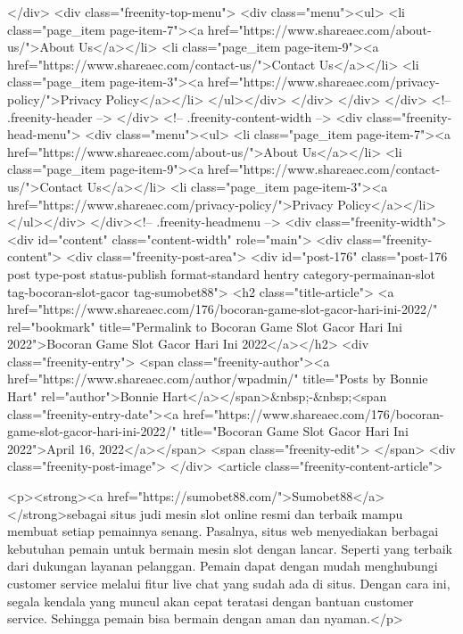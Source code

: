 {				</div>
				<div class="freenity-top-menu">
					<div class="menu"><ul>
<li class="page_item page-item-7"><a href="https://www.shareaec.com/about-us/">About Us</a></li>
<li class="page_item page-item-9"><a href="https://www.shareaec.com/contact-us/">Contact Us</a></li>
<li class="page_item page-item-3"><a href="https://www.shareaec.com/privacy-policy/">Privacy Policy</a></li>
</ul></div>
				</div>
			</div>
		</div> <!-- .freenity-header -->
	</div> <!-- .freenity-content-width -->
	<div class="freenity-head-menu">
		<div class="menu"><ul>
<li class="page_item page-item-7"><a href="https://www.shareaec.com/about-us/">About Us</a></li>
<li class="page_item page-item-9"><a href="https://www.shareaec.com/contact-us/">Contact Us</a></li>
<li class="page_item page-item-3"><a href="https://www.shareaec.com/privacy-policy/">Privacy Policy</a></li>
</ul></div>
	</div><!-- .freenity-headmenu -->
	<div class="freenity-width">
		<div id="content" class="content-width" role="main">
			<div class="freenity-content">
				<div class="freenity-post-area">
												<div id="post-176" class="post-176 post type-post status-publish format-standard hentry category-permainan-slot tag-bocoran-slot-gacor tag-sumobet88">
								<h2 class="title-article">
									<a href="https://www.shareaec.com/176/bocoran-game-slot-gacor-hari-ini-2022/" rel="bookmark" title="Permalink to Bocoran Game Slot Gacor Hari Ini 2022">Bocoran Game Slot Gacor Hari Ini 2022</a></h2>
								<div class="freenity-entry">
									<span class="freenity-author"><a href="https://www.shareaec.com/author/wpadmin/" title="Posts by Bonnie Hart" rel="author">Bonnie Hart</a></span>&nbsp;-&nbsp;<span class="freenity-entry-date"><a href="https://www.shareaec.com/176/bocoran-game-slot-gacor-hari-ini-2022/" title="Bocoran Game Slot Gacor Hari Ini 2022">April 16, 2022</a></span>
									<span class="freenity-edit"> </span>
									<div class="freenity-post-image">  </div>
																		<article class="freenity-content-article">
										
<p><strong><a href="https://sumobet88.com/">Sumobet88</a> </strong>sebagai situs judi mesin slot online resmi dan terbaik mampu membuat setiap pemainnya senang. Pasalnya, situs web menyediakan berbagai kebutuhan pemain untuk bermain mesin slot dengan lancar. Seperti yang terbaik dari dukungan layanan pelanggan. Pemain dapat dengan mudah menghubungi customer service melalui fitur live chat yang sudah ada di situs. Dengan cara ini, segala kendala yang muncul akan cepat teratasi dengan bantuan customer service. Sehingga pemain bisa bermain dengan aman dan nyaman.</p>



}
